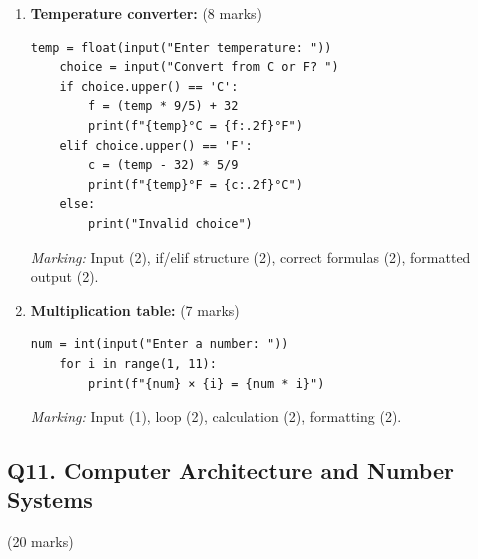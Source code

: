 \documentclass[12pt]{article}
\begin{document}
\begin{enumerate}[label=(\alph*)]
    \item \textbf{Temperature converter:} \hfill (8 marks)
    \begin{lstlisting}[numbers=none]
    temp = float(input("Enter temperature: "))
    choice = input("Convert from C or F? ")
    if choice.upper() == 'C':
        f = (temp * 9/5) + 32
        print(f"{temp}°C = {f:.2f}°F")
    elif choice.upper() == 'F':
        c = (temp - 32) * 5/9
        print(f"{temp}°F = {c:.2f}°C")
    else:
        print("Invalid choice")
    \end{lstlisting}
    \textit{Marking:} Input (2), if/elif structure (2), correct formulas (2), formatted output (2).

    \item \textbf{Multiplication table:} \hfill (7 marks)
    \begin{lstlisting}[numbers=none]
    num = int(input("Enter a number: "))
    for i in range(1, 11):
        print(f"{num} × {i} = {num * i}")
    \end{lstlisting}
    \textit{Marking:} Input (1), loop (2), calculation (2), formatting (2).
\end{enumerate}

\bigskip

\subsection*{Q11. Computer Architecture and Number Systems} \hfill (20 marks)
\end{document}
